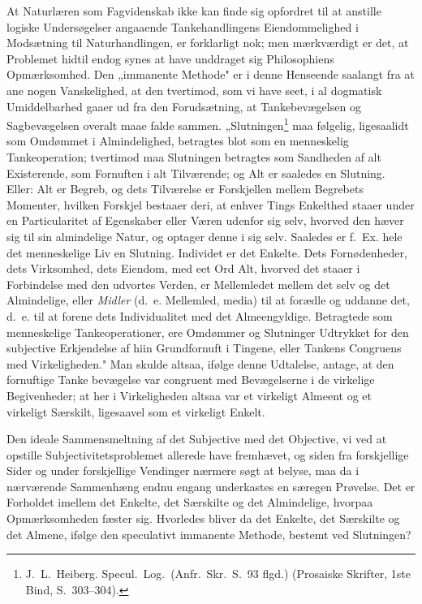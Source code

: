 \documentclass[12pt]{book}
\newcommand{\opage}[1]{\marginnote{\footnotesize\textit{[#1]}}}
\begin{document}
At Naturlæren som Fagvidenskab ikke kan finde sig opfordret til at anstille logiske Undersøgelser
angaaende Tankehandlingens Eiendommelighed i Modsætning til Naturhandlingen, er forklarligt nok;
men mærkværdigt er det, at Problemet hidtil endog synes at have unddraget sig Philosophiens
Opmærksomhed. Den „immanente Methode" er i denne Henseende saalangt fra at ane nogen Vanskelighed,
at den tvertimod, som vi have seet, i al dogmatisk Umiddelbarhed gaaer ud fra den Forudsætning, at
Tankebevægelsen og Sagbevægelsen overalt maae falde sammen. „Slutningen\footnote{J.\ L.\ Heiberg.
Specul.\ Log.\ (Anfr.\ Skr.\ S.~93 flgd.) (Prosaiske Skrifter, 1ste Bind, S.~303--304).} maa
følgelig, ligesaalidt som Omdømmet i Almindelighed, betragtes blot som en menneskelig
Tankeoperation; tvertimod maa Slutningen betragtes som Sandheden af alt Existerende, som Fornuften i
alt Tilværende; og Alt er saaledes en Slutning. Eller: Alt er Begreb, og dets Tilværelse er
Forskjellen mellem Begrebets Momenter, hvilken Forskjel bestaaer deri, at enhver Tings Enkelthed
staaer under en Particularitet af Egenskaber eller Væren udenfor sig selv, hvorved den hæver sig til
sin almindelige Natur, og optager denne i sig selv. Saaledes er f.\ Ex. hele det menneskelige Liv en
Slutning. Individet er det Enkelte. Dets Fornødenheder, dets Virksomhed, dets Eiendom, med eet Ord
Alt, hvorved det staaer i Forbindelse med den udvortes Verden, er Mellemledet mellem det selv og det
Almindelige, eller \emph{Midler} (d.\ e. Mellemled, media) til at forædle og uddanne det, d.\ e. til
at forene dets Individualitet med det Almeengyldige. Betragtede som menneskelige Tankeoperationer,
ere Omdømmer og Slutninger Udtrykket for den subjective Erkjendelse af hiin Grundfornuft i Tingene,
eller Tankens Congruens med Virkeligheden." Man skulde altsaa, ifølge denne Udtalelse, antage, at
den fornuftige Tanke%
\opage{214} bevægelse var congruent med Bevægelserne i de virkelige Begivenheder; at her i Virkeligheden altsaa
var et virkeligt Almeent og et virkeligt Særskilt, ligesaavel som et virkeligt Enkelt.

Den ideale Sammensmeltning af det Subjective med det Objective, vi ved at opstille
Subjectivitetsproblemet allerede have fremhævet, og siden fra forskjellige Sider og under
forskjellige Vendinger nærmere søgt at belyse, maa da i nærværende Sammenhæng endnu engang
underkastes en særegen Prøvelse. Det er Forholdet imellem det Enkelte, det Særskilte og det
Almindelige, hvorpaa Opmærksomheden fæster sig. Hvorledes bliver da det Enkelte, det Særskilte og
det Almene, ifølge den speculativt immanente Methode, bestemt ved Slutningen?
\end{document}
